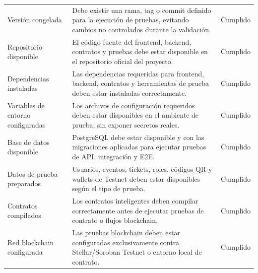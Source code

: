 \documentclass[12pt,letterpaper]{article}
\begin{document}
\begin{table}[H]
\centering
\begingroup
\scriptsize
\setlength{\tabcolsep}{3pt}
\renewcommand{\arraystretch}{1.22}

\begin{tabularx}{\textwidth}{|
>{\raggedright\arraybackslash}p{3.5cm}|
>{\raggedright\arraybackslash}X|
>{\centering\arraybackslash}p{2.2cm}|}
\hline
\multicolumn{1}{|>{\centering\arraybackslash}m{3.5cm}|}{\textbf{Criterio}} &
\multicolumn{1}{>{\centering\arraybackslash}m{8.5cm}|}{\textbf{Descripción}} &
\multicolumn{1}{>{\centering\arraybackslash}m{2.2cm}|}{\textbf{Estado}} \\
\hline

Versión congelada &
Debe existir una rama, tag o commit definido para la ejecución de pruebas, evitando cambios no controlados durante la validación. &
Cumplido \\
\hline

Repositorio disponible &
El código fuente del frontend, backend, contratos y pruebas debe estar disponible en el repositorio oficial del proyecto. &
Cumplido \\
\hline

Dependencias instaladas &
Las dependencias requeridas para frontend, backend, contratos y herramientas de prueba deben estar instaladas correctamente. &
Cumplido \\
\hline

Variables de entorno configuradas &
Los archivos de configuración requeridos deben estar disponibles en el ambiente de prueba, sin exponer secretos reales. &
Cumplido \\
\hline

Base de datos disponible &
PostgreSQL debe estar disponible y con las migraciones aplicadas para ejecutar pruebas de API, integración y E2E. &
Cumplido \\
\hline

Datos de prueba preparados &
Usuarios, eventos, tickets, roles, códigos QR y wallets de Testnet deben estar disponibles según el tipo de prueba. &
Cumplido \\
\hline

Contratos compilados &
Los contratos inteligentes deben compilar correctamente antes de ejecutar pruebas de contrato o flujos blockchain. &
Cumplido \\
\hline

Red blockchain configurada &
Las pruebas blockchain deben estar configuradas exclusivamente contra Stellar/Soroban Testnet o entorno local de contrato. &
Cumplido \\
\hline


\end{tabularx}
\end{table}
\end{document}

